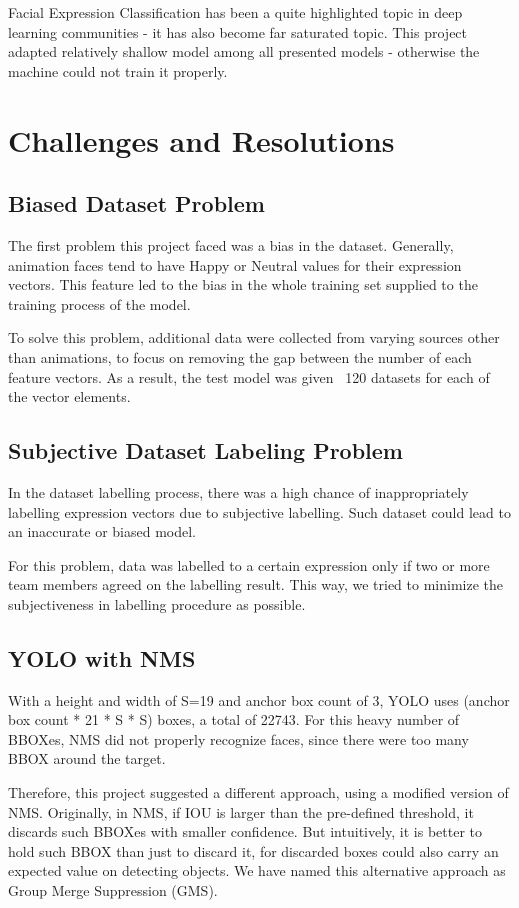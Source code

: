 \documentclass{article}
\begin{document}
Facial Expression Classification has been a quite highlighted topic in deep
learning communities - it has also become far saturated topic. This project
adapted relatively shallow model among all presented models - otherwise the
machine could not train it properly.

\section{Challenges and Resolutions}
\subsection{Biased Dataset Problem}
The first problem this project faced was a bias in the dataset. Generally,
animation faces tend to have Happy or Neutral values for their expression
vectors. This feature led to the bias in the whole training set supplied to the
training process of the model.

To solve this problem, additional data were collected from varying sources other
than animations, to focus on removing the gap between the number of each feature
vectors. As a result, the test model was given ~120 datasets for each of the
vector elements.

\subsection{Subjective Dataset Labeling Problem}
In the dataset labelling process, there was a high chance of inappropriately
labelling expression vectors due to subjective labelling. Such dataset could
lead to an inaccurate or biased model.

For this problem, data was labelled to a certain expression only if two or more
team members agreed on the labelling result. This way, we tried to minimize the
subjectiveness in labelling procedure as possible.

\subsection{YOLO with NMS}
With a height and width of S=19 and anchor box count of 3, YOLO uses (anchor box
count * 21 * S * S) boxes, a total of 22743. For this heavy number of BBOXes,
NMS did not properly recognize faces, since there were too many BBOX around the
target.

Therefore, this project suggested a different approach, using a modified version
of NMS. Originally, in NMS, if IOU is larger than the pre-defined threshold, it
discards such BBOXes with smaller confidence. But intuitively, it is better to
hold such BBOX than just to discard it, for discarded boxes could also carry an
expected value on detecting objects. We have named this alternative approach as
Group Merge Suppression (GMS).
\end{document}
